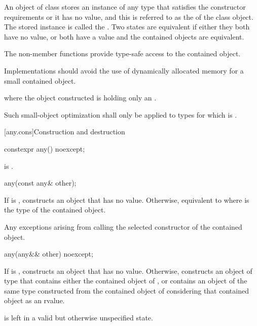 \pnum
An object of class  stores an instance of any type that satisfies the constructor requirements or it has no value,
and this is referred to as the  of the class  object.
The stored instance is called the .
Two states are equivalent if either they both have no value, or both have a value and the contained objects are equivalent.

\pnum
The non-member  functions provide type-safe access to the contained object.

\pnum
Implementations should avoid the use of dynamically allocated memory for a small contained object.
\begin{example}
where the object constructed is holding only an .
\end{example}
Such small-object optimization shall only be applied to types  for which
 is .

[any.cons]{Construction and destruction}

%
\begin{itemdecl}
constexpr any() noexcept;
\end{itemdecl}

\begin{itemdescr}
\pnum
\postconditions
{} is .
\end{itemdescr}

%
\begin{itemdecl}
any(const any& other);
\end{itemdecl}

\begin{itemdescr}
\pnum
\effects
If  is , constructs an object that has no value.
Otherwise, equivalent to 
where  is the type of the contained object.

\pnum
\throws
Any exceptions arising from calling the selected constructor of the contained object.
\end{itemdescr}

%
\begin{itemdecl}
any(any&& other) noexcept;
\end{itemdecl}

\begin{itemdescr}
\pnum
\effects
If  is , constructs an object that has no value.
Otherwise, constructs an object of type  that
contains either the contained object of , or
contains an object of the same type constructed from
the contained object of  considering that contained object as an rvalue.

\pnum
\postconditions
{} is left in a valid but otherwise unspecified state.
\end{itemdescr}

